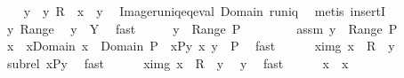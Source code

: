 \begin{isabellebody}
\ \ \isamarkupfalse%
\ y\ \ y{\isacharcolon}\ {\isachardoublequoteopen}R\ {\isacharbackquote}{\isacharbackquote}\ {\isacharbraceleft}x{\isacharbraceright}\ {\isacharequal}\ {\isacharbraceleft}y{\isacharbraceright}{\isachardoublequoteclose}\ \isamarkupfalse%
\ Image{\isacharunderscore}runiq{\isacharunderscore}eq{\isacharunderscore}eval\ Domain\ runiq\ \isamarkupfalse%
\ {\isacharparenleft}metis\ insertI{}{\isacharparenright}\isanewline
\ \ \isamarkupfalse%
\ y\ Range\ \isamarkupfalse%
\ {\isachardoublequoteopen}y\ {\isasymin}\ Y{\isachardoublequoteclose}\ \isamarkupfalse%
\ fast\isanewline
\ \ \isamarkupfalse%
\ \isamarkupfalse%
\ {\isachardoublequoteopen}y\ {\isasymnotin}\ Range\ {\isacharquery}P{\isachardoublequoteclose}\isanewline
\ \ \isamarkupfalse%
\isanewline
\ \ \ \ \isamarkupfalse%
\ assm{\isacharcolon}\ {\isachardoublequoteopen}y\ {\isasymin}\ Range\ {\isacharquery}P{\isachardoublequoteclose}\isanewline
\ \ \ \ \isamarkupfalse%
\ \isamarkupfalse%
\ x{\isacharprime}\ \ x{\isacharprime}{\isacharunderscore}Domain{\isacharcolon}\ {\isachardoublequoteopen}x{\isacharprime}\ {\isasymin}\ Domain\ {\isacharquery}P{\isachardoublequoteclose}\ \ x{\isacharprime}{\isacharunderscore}P{\isacharunderscore}y{\isacharcolon}\ {\isachardoublequoteopen}{\isacharparenleft}x{\isacharprime}{\isacharcomma}\ y{\isacharparenright}\ {\isasymin}\ {\isacharquery}P{\isachardoublequoteclose}\ \isamarkupfalse%
\ fast\isanewline
\ \ \ \ \isamarkupfalse%
\ x{\isacharprime}{\isacharunderscore}img{\isacharcolon}\ {\isachardoublequoteopen}x{\isacharprime}\ {\isasymin}\ R{\isasyminverse}\ {\isacharbackquote}{\isacharbackquote}\ {\isacharbraceleft}y{\isacharbraceright}{\isachardoublequoteclose}\ \isamarkupfalse%
\ subrel\ x{\isacharprime}{\isacharunderscore}P{\isacharunderscore}y\ \isamarkupfalse%
\ fast\isanewline
\ \ \ \ \isamarkupfalse%
\ x{\isacharunderscore}img{\isacharcolon}\ {\isachardoublequoteopen}x\ {\isasymin}\ R{\isasyminverse}\ {\isacharbackquote}{\isacharbackquote}\ {\isacharbraceleft}y{\isacharbraceright}{\isachardoublequoteclose}\ \isamarkupfalse%
\ y\ \isamarkupfalse%
\ fast\isanewline
\ \ \ \ \isamarkupfalse%
\ {\isachardoublequoteopen}x{\isacharprime}\ {\isasymnoteq}\ x{\isachardoublequoteclose}\isanewline

\end{isabellebody}
